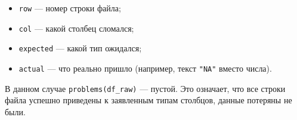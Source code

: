 \documentclass[
]{article}
\providecommand{\tightlist}{%
  \setlength{\itemsep}{0pt}\setlength{\parskip}{0pt}}
\begin{document}
\begin{itemize}
\tightlist
\item
  \texttt{row} --- номер строки файла;
\item
  \texttt{col} --- какой столбец сломался;
\item
  \texttt{expected} --- какой тип ожидался;
\item
  \texttt{actual} --- что реально пришло (например, текст \texttt{"NA"}
  вместо числа).
\end{itemize}

В данном случае \texttt{problems(df\_raw)} --- пустой. Это означает, что
все строки файла успешно приведены к заявленным типам столбцов, данные
потеряны не были.
\end{document}

